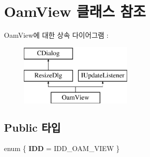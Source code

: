 \hypertarget{class_oam_view}{}\section{Oam\+View 클래스 참조}
\label{class_oam_view}
Oam\+View에 대한 상속 다이어그램 \+: \begin{figure}[H]
\begin{center}
\leavevmode
\includegraphics[height=3.000000cm]{class_oam_view}
\end{center}
\end{figure}
\subsection*{Public 타입}
\begin{DoxyCompactItemize}
\item 
\mbox{\label{class_oam_view_ac29ce9205f4917f10053370f06262098}} 
enum \{ {\bfseries I\+DD} = I\+D\+D\+\_\+\+O\+A\+M\+\_\+\+V\+I\+EW
 \}
\end{DoxyCompactItemize}
